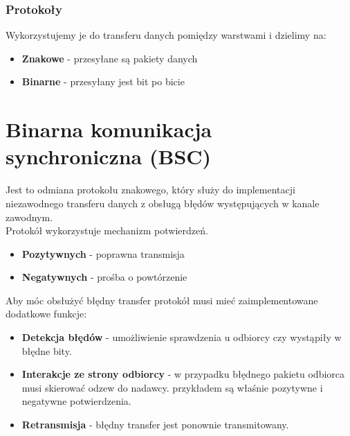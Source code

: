 	\section{Protokoły}
		Wykorzystujemy je do transferu danych pomiędzy warstwami i dzielimy na:
		\begin{itemize}
			\item \textbf{Znakowe} - przesyłane są pakiety danych
			\item \textbf{Binarne} - przesyłany jest bit po bicie
		\end{itemize}


\part{Binarna komunikacja synchroniczna (BSC)}
	Jest to odmiana protokołu znakowego, który służy do implementacji niezawodnego transferu danych z obsługą błędów występujących w kanale zawodnym.\\
	Protokół wykorzystuje mechanizm potwierdzeń.
	\begin{itemize}
		\item \textbf{Pozytywnych} - poprawna transmisja
		\item \textbf{Negatywnych} - prośba o powtórzenie
	\end{itemize}
	Aby móc obsłużyć błędny transfer protokół musi mieć zaimplementowane dodatkowe funkcje:
	\begin{itemize}
		\item \textbf{Detekcja błędów} - umożliwienie sprawdzenia u odbiorcy czy wystąpiły w błędne bity.
		\item \textbf{Interakcje ze strony odbiorcy} - w przypadku błędnego pakietu odbiorca musi skierować odzew do nadawcy. przykładem są właśnie pozytywne i negatywne potwierdzenia.
		\item \textbf{Retransmisja} - błędny transfer jest ponownie transmitowany.
	\end{itemize}
